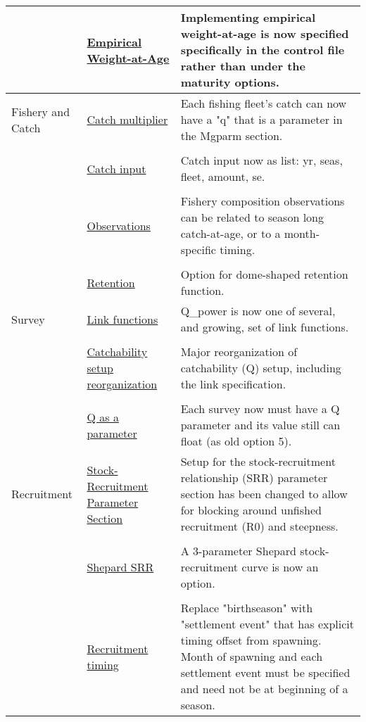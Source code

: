 \begin{center}
\begin{longtable}{p{2cm} p{3cm} p{10cm}}
				  \\
				  & \hyperlink{WAA} {Empirical Weight-at-Age} & Implementing empirical weight-at-age is now specified specifically in the control file rather than under the maturity options.\\
				\hline
				Fishery and Catch & 
					\hyperlink{CatchMult}{Catch multiplier} & 
						Each fishing fleet's catch can now have a "q" that is a parameter in the Mgparm section.\\
				  \\						
					& \hyperlink{CatchFormat}{Catch input} & 
						Catch input now as list:  yr, seas, fleet, amount, se. \\
				  \\						
					& \hyperlink{CompTiming}{Observations} & 
						Fishery composition observations can be related to season long catch-at-age, or to a month-specific timing.\\
				  \\					
					& \hyperlink{DomeRetention}{Retention} & 
						Option for dome-shaped retention function. \\
				\hline
				Survey  
					& \hyperlink{Qsetup}{Link functions} & 
						Q\_power is now one of several, and growing, set of link functions. \\
				  \\						
					& \hyperlink{Qsetup}{Catchability setup reorganization} & 
						Major reorganization of catchability (Q) setup, including the link specification. \\
				  \\					
					& \multicolumn{1}{l}{\hyperlink{Qsetup}{Q as a parameter}} & 
						Each survey now must have a Q parameter and its value still can float (as old option 5).\\
				\hline
				Recruitment
					& \hyperlink{SRR}{Stock-Recruitment Parameter Section} & Setup for the stock-recruitment relationship (SRR) parameter section has been changed to allow for blocking around unfished recruitment (R0) and steepness.\\ 
					\\
					& \hyperlink{Shepard}{Shepard SRR} & 
						A 3-parameter Shepard stock-recruitment curve is now an option.\\
					\\
					& \hyperlink{RecrTiming}{Recruitment timing} & 
						Replace "birthseason" with "settlement event" that has explicit timing offset from spawning.  Month of spawning and each settlement event must be specified and need not be at beginning of a season.\\

\end{longtable}
\end{center}
